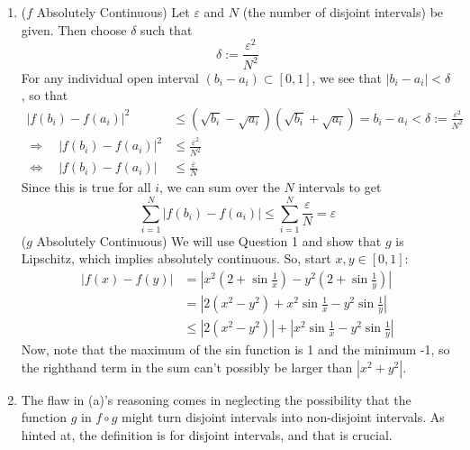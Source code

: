 \documentclass[12pt]{article}
\theoremstyle{plain}
\theoremstyle{definition}
\theoremstyle{remark}
\begin{document}
\begin{enumerate}
\begin{enumerate}
\item ($f$ Absolutely Continuous) Let $\varepsilon$ and $N$ (the number of disjoint intervals) be given. Then choose $\delta$ such that 
\begin{equation}
    \label{q2b}
    \delta:= \frac{\varepsilon^2}{N^2}
\end{equation}
For any individual open interval $(b_i-a_i)\subset[0,1]$, we see that $|b_i-a_i|<\delta$, so that
\begin{align*}
    |f({b_i})-f({a_i})|^2 &\leq
    \left(\sqrt{b_i}-\sqrt{a_i}\right)\left(\sqrt{b_i}+\sqrt{a_i}\right) 
    = b_i - a_i < \delta := \frac{\varepsilon^2}{N^2} \\
    \Rightarrow\quad
    |f({b_i})-f({a_i})|^2 &\leq \frac{\varepsilon^2}{N^2} \\
    \Leftrightarrow\quad
    |f({b_i})-f({a_i})| &\leq \frac{\varepsilon}{N} 
\end{align*}
Since this is true for all $i$, we can sum over the $N$ intervals to get 
\[
  \sum_{i=1}^N  |f({b_i})-f({a_i})| 
  \leq \sum_{i=1}^N\frac{\varepsilon}{N} = \varepsilon
\]
($g$ Absolutely Continuous) We will use Question 1 and show that $g$ is Lipschitz, which implies absolutely continuous. So, start $x,y\in[0,1]$:
\begin{align*}
    |f({x})-f({y})| &= \left\lvert 
    x^2\left(2+\sin\frac{1}{x}\right) -
    y^2\left(2+\sin\frac{1}{y}\right) \right\rvert \\
    &= \left\lvert 2(x^2 - y^2) + x^2\sin\frac{1}{x}
    - y^2\sin\frac{1}{y}\right\rvert \\
    &\leq \left\lvert 2(x^2 - y^2)\right\rvert 
    + \left\lvert x^2\sin\frac{1}{x}
    - y^2\sin\frac{1}{y}\right\rvert 
\end{align*}
Now, note that the maximum of the sin function is 1 and the minimum -1, so the righthand term in the sum can't possibly be larger than $|x^2 + y^2|$.

\item The flaw in (a)'s reasoning comes in neglecting the possibility that the function $g$ in $f\circ g$ might turn disjoint intervals into non-disjoint intervals. As hinted at, the definition is for disjoint intervals, and that is crucial.


\end{enumerate}
\end{enumerate}
\end{document}
